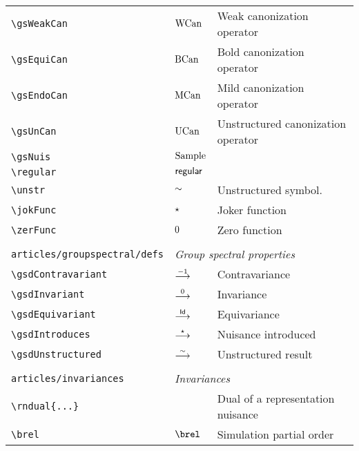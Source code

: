 \begin{longtable}{lll}
 {\color[rgb]{0.5,0.5,0.5}\texttt{\textbackslash gsWeakCan}} & $\text{WCan}$ &  Weak canonization operator\\ 
 {\color[rgb]{0.5,0.5,0.5}\texttt{\textbackslash gsEquiCan}} & $\text{BCan}$ &  Bold canonization operator\\ 
 {\color[rgb]{0.5,0.5,0.5}\texttt{\textbackslash gsEndoCan}} & $\text{MCan}$ &  Mild canonization operator\\ 
 {\color[rgb]{0.5,0.5,0.5}\texttt{\textbackslash gsUnCan}} & $\text{UCan}$ &  Unstructured canonization operator\\ 
 {\color[rgb]{0.5,0.5,0.5}\texttt{\textbackslash gsNuis}} & $\text{Sample}$ &  \\ 
 {\color[rgb]{0.5,0.5,0.5}\texttt{\textbackslash regular}} & $\mathsf{regular}$ & \\ 
 {\color[rgb]{0.5,0.5,0.5}\texttt{\textbackslash unstr}} & $\sim$ &  Unstructured symbol.\\ 
 {\color[rgb]{0.5,0.5,0.5}\texttt{\textbackslash jokFunc}} & $\star$ &  Joker function\\ 
 {\color[rgb]{0.5,0.5,0.5}\texttt{\textbackslash zerFunc}} & $0$ &  Zero function\\ 
  &  & \\ 
 {\color[rgb]{0.5,0.5,0.5}\texttt{articles/groupspectral/defs}} & \multicolumn{2}{l}{\emph{Group spectral properties}}\\ 
 \hline
{\color[rgb]{0.5,0.5,0.5}\texttt{\textbackslash gsdContravariant}} & $\stackrel{-1}{\longrightarrow}$ &  Contravariance\\ 
 {\color[rgb]{0.5,0.5,0.5}\texttt{\textbackslash gsdInvariant}} & $\stackrel{0}{\longrightarrow}$ &  Invariance\\ 
 {\color[rgb]{0.5,0.5,0.5}\texttt{\textbackslash gsdEquivariant}} & $\stackrel{\mathsf{Id}}{\longrightarrow}$ &  Equivariance\\ 
 {\color[rgb]{0.5,0.5,0.5}\texttt{\textbackslash gsdIntroduces}} & $\stackrel{\star}{\longrightarrow}$ &  Nuisance introduced\\ 
 {\color[rgb]{0.5,0.5,0.5}\texttt{\textbackslash gsdUnstructured}} & $\stackrel{\sim}{\longrightarrow}$ &  Unstructured result\\ 
  &  & \\ 
 {\color[rgb]{0.5,0.5,0.5}\texttt{articles/invariances}} & \multicolumn{2}{l}{\emph{Invariances}}\\ 
 \hline
{\color[rgb]{0.5,0.5,0.5}\texttt{\textbackslash rndual\{...\}}} &  &  Dual of a representation nuisance\\ 
 {\color[rgb]{0.5,0.5,0.5}\texttt{\textbackslash brel}} & $\brel$ &  Simulation partial order\\ 

\end{longtable}

